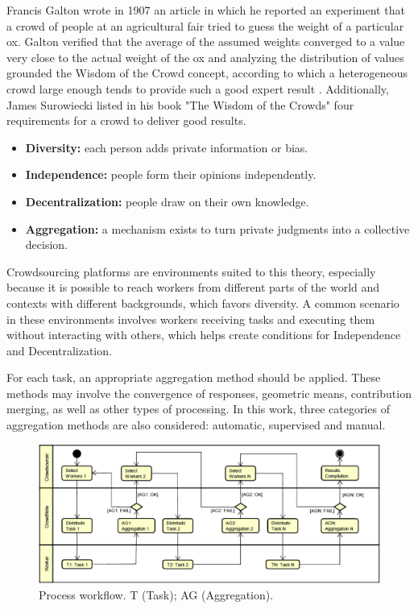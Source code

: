 Francis Galton wrote in 1907 an article in which he reported an experiment that a crowd of people at an agricultural fair tried to guess the weight of a particular ox. Galton verified that the average of the assumed weights converged to a value very close to the actual weight of the ox and analyzing the distribution of values grounded the Wisdom of the Crowd concept, according to which a heterogeneous crowd large enough tends to provide such a good expert result \cite{GALTON1907}. Additionally, James Surowiecki listed in his book "The Wisdom of the Crowds" \cite{surowiecki2005wisdom} four requirements for a crowd to deliver good results.

\begin{itemize}
\item{\textbf{Diversity:}} each person adds private information or bias.
\item{\textbf{Independence:}} people form their opinions independently.
\item{\textbf{Decentralization:}} people draw on their own knowledge.
\item{\textbf{Aggregation:}} a mechanism exists to turn private judgments into a collective decision.
\end{itemize}

Crowdsourcing platforms are environments suited to this theory, especially because it is possible to reach workers from different parts of the world and contexts with different backgrounds, which favors diversity. A common scenario in these environments involves workers receiving tasks and executing them without interacting with others, which helps create conditions for Independence and Decentralization.

For each task, an appropriate aggregation method should be applied. These methods may involve the convergence of responses, geometric means, contribution merging, as well as other types of processing. In this work, three categories of aggregation methods are also considered: automatic, supervised and manual.


\begin{figure}[!th]
	\centerline{\includegraphics[scale=0.38] {figure/method}}
	\caption{Process workflow. T (Task);  AG (Aggregation).}
	\label{method}
\end{figure}

